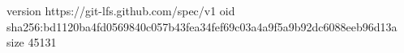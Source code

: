 version https://git-lfs.github.com/spec/v1
oid sha256:bd1120ba4fd0569840c057b43fea34fef69c03a4a9f5a9b92dc6088eeb96d13a
size 45131
